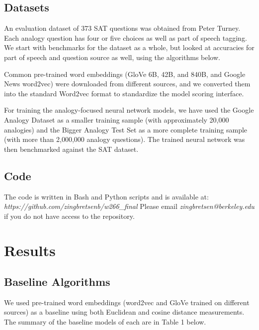 \documentclass[11pt]{article}
\begin{document}
\subsection{Datasets}

An evaluation dataset of 373 SAT questions was obtained from Peter
Turney. Each analogy question has four or five choices as well as part
of speech tagging. We start with benchmarks for the dataset as a whole,
but looked at accuracies for part of speech and question source as well,
using the algorithms below.

Common pre-trained word embeddings (GloVe 6B, 42B, and 840B, and Google
News word2vec) were downloaded from different sources, and we converted
them into the standard Word2vec format to standardize the model scoring
interface.

For training the analogy-focused neural network models, we have used the
Google Analogy Dataset as a smaller training sample (with approximately
20,000 analogies) and the Bigger Analogy Test Set as a more complete
training sample (with more than 2,000,000 analogy questions). The
trained neural network was then benchmarked against the SAT dataset.

\subsection{Code}

The code is written in Bash and Python scripts and is available at: \emph{https://github.com/zingbretsenb/w266\_final}
Please email \emph{zingbretsen@berkeley.edu} if you do not have access to the repository.

\section{Results }

\subsection{Baseline Algorithms}

We used pre-trained word embeddings (word2vec and GloVe trained on
different sources) as a baseline using both Euclidean and cosine
distance measurements. The summary of the baseline models of each are in
Table 1 below.
\end{document}
